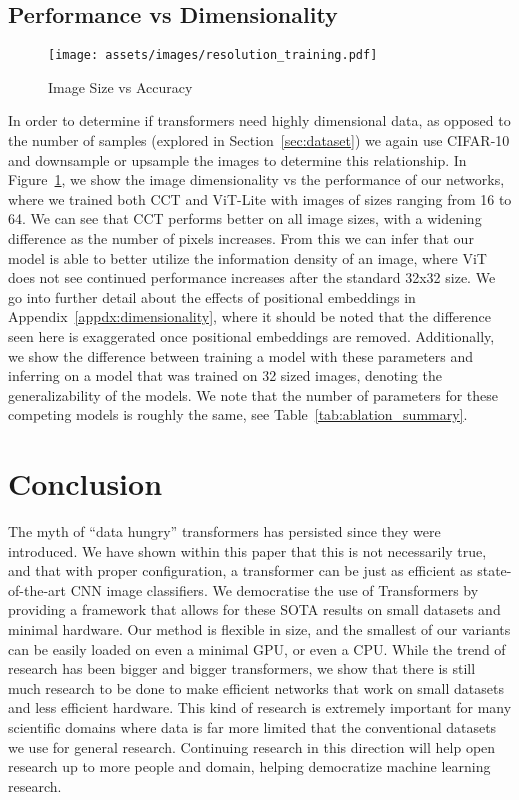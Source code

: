 \documentclass[10pt,twocolumn,letterpaper]{article}
\begin{document}
\subsection{Performance vs Dimensionality}\label{sec:dimensionality}

\begin{figure}[ht!]
    \centering
    \texttt{[image: assets/images/resolution\_training.pdf]}
    \caption{Image Size vs Accuracy}
    \label{fig:sizeruns}
\end{figure}



In order to determine if transformers need highly dimensional data, as opposed to the number of samples (explored in Section~\ref{sec:dataset}) 
we again use CIFAR-10 and downsample or upsample the images to determine this relationship. 
In Figure~\ref{fig:sizeruns}, we show the image dimensionality vs the performance of our networks, where we trained both CCT and ViT-Lite with images of sizes ranging from 16 to 64.
We can see that CCT performs better on all image sizes, with a widening difference as the number of pixels increases.
From this we can infer that our model is able to better utilize the information density of an image, where ViT does not see continued performance increases after the standard 32x32 size.
We go into further detail about the effects of positional embeddings in Appendix~\ref{appdx:dimensionality}, where it should be noted that the difference seen here is exaggerated once positional embeddings are removed.
Additionally, we show the difference between training a model with these parameters and inferring on a model that was trained on 32 sized images, denoting the generalizability of the models. 
We note that the number of parameters for these competing models is roughly the same, see Table~\ref{tab:ablation_summary}.



\section{Conclusion}
The myth of ``data hungry'' transformers has persisted since they were introduced.
We have shown within this paper that this is not necessarily true, and that with proper configuration, a transformer can be just as efficient as state-of-the-art CNN image classifiers. 
We democratise the use of Transformers by providing a framework that allows for these SOTA results on small datasets and minimal hardware. Our method is flexible in size, and the smallest of our variants can be easily loaded on even a minimal GPU, or even a CPU.
While the trend of research has been bigger and bigger transformers, we show that there is still much research to be done to make efficient networks that work on small datasets and less efficient hardware. 
This kind of research is extremely important for many scientific domains where data is far more limited that the conventional datasets we use for general research. 
Continuing research in this direction will help open research up to more people and domain, helping democratize machine learning research.
\end{document}
